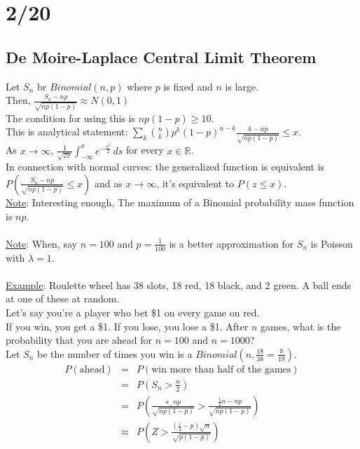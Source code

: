 \section*{2/20}
  \subsection*{De Moire-Laplace Central Limit Theorem}
    Let $S_n$ br $Binomial(n,p)$ where $p$ is fixed and $n$ is large.\\
    Then, $\frac{S_n - np}{\sqrt{np(1-p)}} \approx N(0,1)$\\
    The condition for using this is $np(1-p) \ge 10$.\\
    This is analytical statement:
    $\sum_k \binom{n}{k}p^k(1-p)^{n-k}\frac{k - np}{\sqrt{np(1-p)}} \le
    x$.\\
    As $x \to \infty$, $\frac{1}{\sqrt{2\pi}} \int_{-\infty}^x e^{-\frac{s^2}
    {2}}\,ds$ for every $x \in \mathbb{R}$.\\
    In connection with normal curves: the generalized function is equivalent is
    $P(\frac{S_n - np}{\sqrt{np(1-p)}} \le x)$ and as $x \to \infty$,
    it's equivalent to $P(z \le x)$.\\
    \underline{Note}: Interesting enough, The maximum of a Binomial probability
    mass function is $np$.\\\\
    \underline{Note}: When, say $n = 100$ and $p = \frac{1}{100}$ is a better
    approximation for $S_n$ is Poisson with $\lambda = 1$.\\\\
    \underline{Example}: Roulette wheel has 38 slots, 18 red, 18 black, and
      2 green. A ball ends at one of these at random.\\
      Let's say you're a player who bet \$1 on every game on red.\\
      If you win, you get a \$1. If you lose, you lose a \$1.
      After $n$ games, what is the probability that you are ahead for $n = 100$
      and $n = 1000$?\\
      Let $S_n$ be the number of times you win is a $Binomial(n, \frac{18}
      {38} = \frac{9}{19})$.\\
      \begin{eqnarray*}
        P(\text{ahead}) & = & P(\text{win more than half of the games})\\
          & = & P\left(S_n > \frac{n}{2}\right)\\
          & = & P\left(\frac{s_ - np}{\sqrt{np(1-p)}} > \frac{\frac{1}{2}n -
            np}{\sqrt{np(1-p)}}\right)\\
          & \approx & P\left(Z > \frac{(\frac{1}{2} - p)\sqrt{n}}
          {\sqrt{p(1-p)}}\right)
      \end{eqnarray*}
